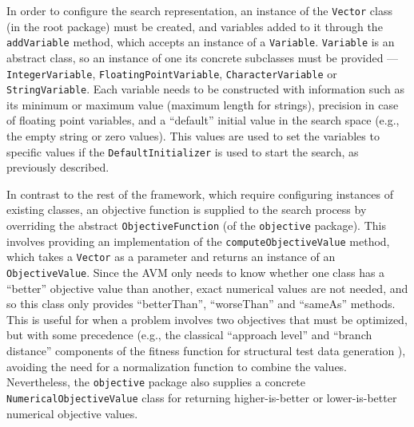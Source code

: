 \documentclass{llncs}
\newcommand{\inlineheading}[1]{\vspace{1ex} \noindent {\bf #1.}}
\begin{document}
\begin{sloppypar}
\inlineheading{Representation} In order to configure the search representation, an instance of the {\tt Vector} class (in the root package) must be created, and variables added to it through the {\tt addVariable} method, which accepts an instance of a {\tt Variable}. {\tt Variable} is an abstract class, so an instance of one its concrete subclasses must be provided --- {\tt IntegerVariable}, {\tt FloatingPointVariable}, {\tt CharacterVariable} or {\tt StringVariable}. Each variable needs to be constructed with information such as its minimum or maximum value (maximum length for strings), precision in case of floating point variables, and a ``default'' initial value in the search space (e.g., the empty string or zero values). This values are used to set the variables to specific values if the {\tt DefaultInitializer} is used to start the search, as previously described.
\end{sloppypar}

\begin{sloppypar}
\inlineheading{Objective Function} In contrast to the rest of the framework, which require configuring instances of existing classes, an objective function is supplied to the search process by overriding the abstract {\tt ObjectiveFunction} (of the {\tt objective} package). This involves providing an implementation of the {\tt computeObjectiveValue} method, which takes a {\tt Vector} as a parameter and returns an instance of an {\tt ObjectiveValue}. Since the AVM only needs to know whether one class has a ``better'' objective value than another, exact numerical values are not needed, and so this class only provides ``betterThan'', ``worseThan'' and ``sameAs'' methods. This is useful for when a problem involves two objectives that must be optimized, but with some precedence (e.g., the classical ``approach level'' and ``branch distance'' components of the fitness function for structural test data generation \cite{}), avoiding the need for a normalization function to combine the values. %
Nevertheless, the {\tt objective} package also supplies a concrete {\tt NumericalObjectiveValue} class for returning higher-is-better or lower-is-better numerical objective values.
\end{sloppypar}
\end{document}
